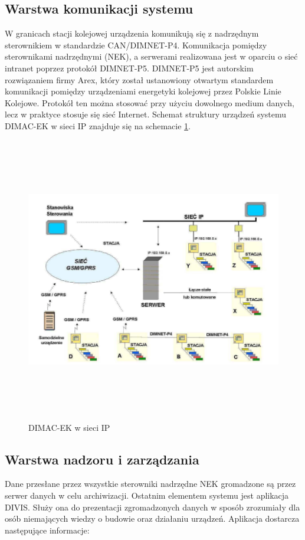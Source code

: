 \subsection{Warstwa komunikacji systemu}
W granicach stacji kolejowej urządzenia komunikują się z nadrzędnym sterownikiem w standardzie CAN/DIMNET-P4\cite{dimacek-wytyczne}.
Komunikacja pomiędzy sterownikami nadrzędnymi (NEK), a serwerami realizowana jest w oparciu o sieć intranet poprzez protokół DIMNET-P5. DIMNET-P5 jest autorskim rozwiązaniem firmy Arex, który został ustanowiony otwartym standardem komunikacji pomiędzy urządzeniami energetyki kolejowej przez Polskie Linie Kolejowe. Protokół ten można stosować przy użyciu dowolnego medium danych, lecz w praktyce stosuje się sieć Internet. Schemat struktury urządzeń systemu DIMAC-EK w sieci IP znajduje się na schemacie \ref{fig:dimacek_ip}.


\begin{figure}[t]
	\centerline{\includegraphics[height=125mm]{./img/dimacek_ip.png}}
	\caption{DIMAC-EK w sieci IP \cite{arex-materials}}
	\label{fig:dimacek_ip}
\end{figure}


\subsection{Warstwa nadzoru i zarządzania}

Dane przesłane przez wszystkie sterowniki nadrzędne NEK gromadzone są przez serwer danych w celu archiwizacji. Ostatnim elementem systemu jest aplikacja DIVIS. Służy ona do prezentacji zgromadzonych danych w sposób zrozumiały dla osób niemających wiedzy o budowie oraz działaniu urządzeń. Aplikacja dostarcza następujące informacje:


